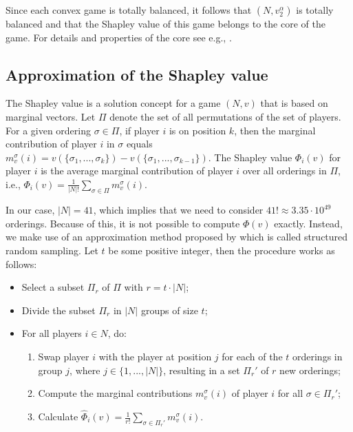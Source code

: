 \documentclass[10p]{article}
\theoremstyle{definition}
\theoremstyle{definition}
\begin{document}
Since each convex game is totally balanced, it follows that $(N,v_2^\alpha)$ is totally balanced and that the Shapley value of this game belongs to the core of the game. For details and properties of the core see e.g., \cite{borm2001operations}.

\subsection{Approximation of the Shapley value}
The Shapley value is a solution concept for a game $(N,v)$ that is based on marginal vectors. Let $\Pi$ denote the set of all permutations of the set of players. For a given ordering $\sigma \in \Pi$, if player $i$ is on position $k$, then the marginal contribution of player $i$ in $\sigma$ equals $m_v^\sigma(i) = v(\{\sigma_1, ..., \sigma_k\}) - v(\{\sigma_1, ..., \sigma_{k-1}\})$. The Shapley value $\Phi_i(v)$ for player $i$ is the average marginal contribution of player $i$ over all orderings in $\Pi$, i.e., $\Phi_i(v) = \frac{1}{|N|!}\sum_{\sigma \in \Pi}m_v^\sigma (i)$. 

In our case, $|N| = 41$, which implies that we need to consider $41! \approx 3.35 \cdot 10^{49}$ orderings. Because of this, it is not possible to compute $\Phi(v)$ exactly. Instead, we make use of an approximation method proposed by \cite{campen2018new} which is called structured random sampling. Let $t$ be some positive integer, then the procedure works as follows:
\begin{itemize} \itemsep0em 
    \item Select a subset $\Pi_r$ of $\Pi$ with $r = t \cdot |N|$;
    \item Divide the subset $\Pi_r$ in $|N|$ groups of size $t$;
    \item For all players $i \in N$, do:
    \begin{enumerate} \itemsep0em 
        \item Swap player $i$ with the player at position $j$ for each of the $t$ orderings in group $j$, where $j \in \{1, ..., |N|\}$, resulting in a set $\Pi_r'$ of $r$ new orderings;
        \item Compute the marginal contributions $m_v^\sigma(i)$ of player $i$ for all $\sigma \in \Pi_r'$;
        \item Calculate $\hat{\Phi}_i(v) = \frac{1}{r !}\sum_{\sigma \in \Pi_r'}m_v^\sigma(i)$.
    \end{enumerate}
\end{itemize}
\end{document}
